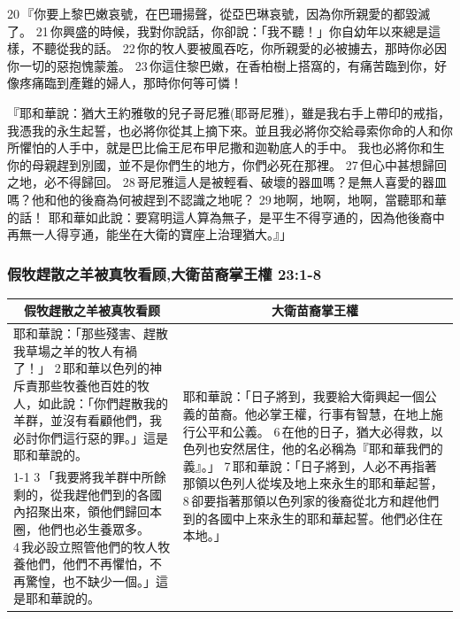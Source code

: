 20 『你要上黎巴嫩哀號，在巴珊揚聲，從亞巴琳哀號，因為你所親愛的都毀滅了。 21 你興盛的時候，我對你說話，你卻說：「我不聽！」你自幼年以來總是這樣，不聽從我的話。 22 你的牧人要被風吞吃，你所親愛的必被擄去，那時你必因你一切的惡抱愧蒙羞。 23 你這住黎巴嫩，在香柏樹上搭窩的，有痛苦臨到你，好像疼痛臨到產難的婦人，那時你何等可憐！

『耶和華說：猶大王約雅敬的兒子哥尼雅(耶哥尼雅)，雖是我右手上帶印的戒指，我憑我的永生起誓，也必將你從其上摘下來。並且我必將你交給尋索你命的人和你所懼怕的人手中，就是巴比倫王尼布甲尼撒和迦勒底人的手中。
我也必將你和生你的母親趕到別國，並不是你們生的地方，你們必死在那裡。 27 但心中甚想歸回之地，必不得歸回。 28 哥尼雅這人是被輕看、破壞的器皿嗎？是無人喜愛的器皿嗎？他和他的後裔為何被趕到不認識之地呢？ 29 地啊，地啊，地啊，當聽耶和華的話！
耶和華如此說：要寫明這人算為無子，是平生不得亨通的，因為他後裔中再無一人得亨通，能坐在大衛的寶座上治理猶大。』」

\subsubsection{假牧趕散之羊被真牧看顾,大衛苗裔掌王權 23:1-8}
\begin{table}[H]
\centering
\begin{tabular}{p{8.5cm}|p{8.5cm}}\hline\hline
\multicolumn{1}{c|}{假牧趕散之羊被真牧看顾}&\multicolumn{1}{c}{大衛苗裔掌王權}\\\hline
耶和華說：「那些殘害、趕散我草場之羊的牧人有禍了！」 2 耶和華以色列的神斥責那些牧養他百姓的牧人，如此說：「你們趕散我的羊群，並沒有看顧他們，我必討你們這行惡的罪。」這是耶和華說的。
&\multirow{2}{8.76cm}{耶和華說：「日子將到，我要給大衛興起一個公義的苗裔。他必掌王權，行事有智慧，在地上施行公平和公義。 6 在他的日子，猶大必得救，以色列也安然居住，他的名必稱為『耶和華我們的義』。」 7 耶和華說：「日子將到，人必不再指著那領以色列人從埃及地上來永生的耶和華起誓， 8 卻要指著那領以色列家的後裔從北方和趕他們到的各國中上來永生的耶和華起誓。他們必住在本地。」}\\\cline{1-1}
3 「我要將我羊群中所餘剩的，從我趕他們到的各國內招聚出來，領他們歸回本圈，他們也必生養眾多。 4 我必設立照管他們的牧人牧養他們，他們不再懼怕，不再驚惶，也不缺少一個。」這是耶和華說的。&\\\hline
\end{tabular}
\end{table}


 




